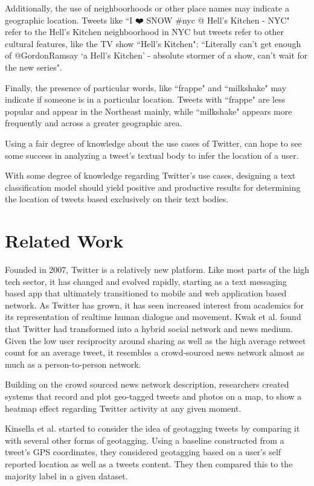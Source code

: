 \documentclass[midd]{thesis}
\begin{document}
Additionally, the use of neighboorhoods or other place names may indicate a geographic location. Tweets like ``I ❤️ SNOW \#nyc @ Hell's Kitchen - NYC" refer to the Hell's Kitchen neighboorhood in NYC but tweets refer to other cultural features, like the TV show ``Hell's Kitchen": ``Literally can't get enough of @GordonRamsay `a Hell's Kitchen' - absolute stormer of a show, can't wait for the new series".

Finally, the presence of particular words, like ``frappe" and ``milkshake" may indicate if someone is in a particular location. Tweets with ``frappe" are less popular and appear in the Northeast mainly, while ``milkshake" appears more frequently and across a greater geographic area.

Using a fair degree of knowledge about the use cases of Twitter,  can hope to see some success in analyzing a tweet's textual body to infer the location of a user.

With some degree of knowledge regarding Twitter's use cases, designing a text classification model should yield positive and productive results for determining the location of tweets based exclusively on their text bodies.

\chapter{Related Work}

Founded in 2007, Twitter is a relatively new platform. Like most parts of the high tech sector, it has changed and evolved rapidly, starting as a text messaging based app that ultimately transitioned to mobile and web application based network. As Twitter has grown, it has seen increased interest from academics for its representation of realtime human dialogue and movement. Kwak et al. \cite{kwak2010twitter} found that Twitter had transformed into a hybrid social network and news medium. Given the low user reciprocity around sharing as well as the high average retweet count for an average tweet, it resembles a crowd-sourced news network almost as much as a person-to-person network.

Building on the crowd sourced news network description, researchers created systems that record and plot geo-tagged tweets and photos on a map, to show a heatmap effect regarding Twitter activity at any given moment. \cite{nakaji2012visualization} \cite{yanai2012world}

Kinsella et al. \cite{kinsella2011m} started to consider the idea of geotagging tweets by comparing it with several other forms of geotagging. Using a baseline constructed from a tweet's GPS coordinates, they considered geotagging based on a user's self reported location as well as a tweets content. They then compared this to the majority label in a given dataset.
\end{document}
